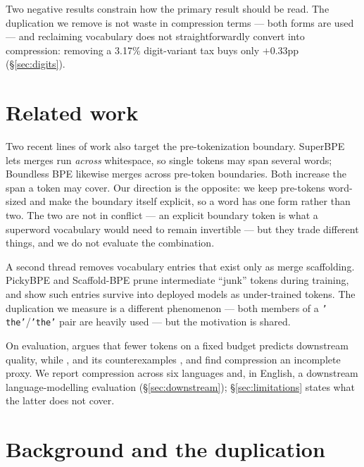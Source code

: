 \documentclass[11pt]{article}
\begin{document}
Two negative results constrain how the primary result should be read. The duplication we
remove is not waste in compression terms --- both forms are used --- and reclaiming
vocabulary does not straightforwardly convert into compression: removing a 3.17\%
digit-variant tax buys only $+0.33$pp (\S\ref{sec:digits}).

\section{Related work}
\label{sec:related}

Two recent lines of work also target the pre-tokenization boundary. SuperBPE
\citep{liu2025superbpe} lets merges run \emph{across} whitespace, so single tokens may span
several words; Boundless BPE \citep{schmidt2025boundless} likewise merges across pre-token
boundaries. Both increase the span a token may cover. Our direction is the opposite: we keep
pre-tokens word-sized and make the boundary itself explicit, so a word has one form rather
than two. The two are not in conflict --- an explicit boundary token is what a superword
vocabulary would need to remain invertible --- but they trade different things, and we do
not evaluate the combination.

A second thread removes vocabulary entries that exist only as merge scaffolding. PickyBPE
\citep{chizhov2024bpegetspickyefficient} and Scaffold-BPE \citep{scaffold_bpe} prune
intermediate ``junk'' tokens during training, and \citet{land-bartolo-2024-fishing} show
such entries survive into deployed models as under-trained tokens. The duplication we
measure is a different phenomenon --- both members of a \texttt{' the'}/\texttt{'the'} pair
are heavily used --- but the motivation is shared.

On evaluation, \citet{galle-2019-investigating} argues that fewer tokens on a fixed budget
predicts downstream quality, while \citet{schmidt-etal-2024-tokenization},
\citet{zouhar-etal-2023-tokenization} and its counterexamples
\citep{cognetta-etal-2024-two}, and \citet{lotz-etal-2025-beyond} find compression an
incomplete proxy. We report compression across six languages and, in English, a
downstream language-modelling evaluation (\S\ref{sec:downstream});
\S\ref{sec:limitations} states what the latter does not cover.

\section{Background and the duplication}
\label{sec:duplication}
\end{document}
